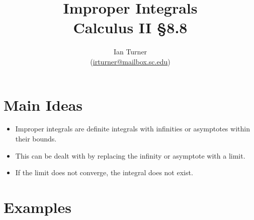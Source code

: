 \documentclass{article}
\begin{document}
\title{
Improper Integrals
\\
\large
Calculus II \S 8.8
} 
\author{
Ian Turner
\\
\small
(\href{mailto:irturner@mailbox.sc.edu}{irturner@mailbox.sc.edu})
}
\maketitle

\section*{Main Ideas}

\begin{itemize}

\item
Improper integrals are definite integrals with infinities or asymptotes within their bounds.

\item
This can be dealt with by replacing the infinity or asymptote with a limit.

\item
If the limit does not converge, the integral does not exist.

\end{itemize}

\section*{Examples}
\end{document}
